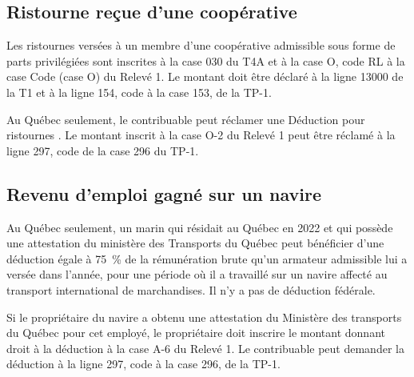 \subsection{Ristourne reçue d'une coopérative}
Les ristournes versées à un membre d'une coopérative admissible sous forme de parts privilégiées sont inscrites à la case 030 du T4A et à la case O, code \og RL \fg{} à la case  \og Code (case O) \fg{} du Relevé 1. Le montant doit être déclaré à la ligne 13000 de la T1 et à la ligne 154, code  \fg{} à la case 153, de la TP-1.

Au Québec seulement, le contribuable peut réclamer une \og Déduction pour ristournes \fg{}. Le montant inscrit à la case O-2 du Relevé 1 peut être réclamé à la ligne 297, code  \fg{} de la case 296 du TP-1.


\subsection{Revenu d'emploi gagné sur un navire}
Au Québec seulement, un marin qui résidait au Québec en 2022 et qui possède une attestation du ministère des Transports du Québec peut bénéficier d'une déduction égale à 75~\% de la rémunération brute qu'un armateur admissible lui a versée dans l'année, pour une période où il a travaillé sur un navire affecté au transport international de marchandises. Il n'y a pas de déduction fédérale.

Si le propriétaire du navire a obtenu une attestation du Ministère des transports du Québec pour cet employé, le propriétaire doit inscrire le montant donnant droit à la déduction à la case A-6 du Relevé 1. Le contribuable peut demander la déduction à la ligne 297, code  \fg{} à la case 296, de la TP-1.


